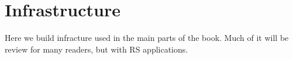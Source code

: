 \part{Infrastructure}

Here we build infracture used in the main parts of the book.  Much of it
will be review for many readers, but with RS applications.

